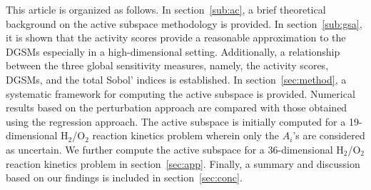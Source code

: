 This article is organized as follows. In section~\ref{sub:ac}, a brief
theoretical background on the active subspace methodology is provided. In
section~\ref{sub:gsa}, it is shown that the activity scores provide a
reasonable approximation to the DGSMs especially in a high-dimensional setting.
Additionally, a relationship between the three global sensitivity measures,
namely, the activity scores, DGSMs, and the total Sobol' indices is
established. In section~\ref{sec:method}, a systematic framework for computing
the active subspace is provided. 
Numerical results based on the perturbation approach are compared with those
obtained using the regression approach.  The active 
subspace is initially computed for a 19-dimensional 
H$_2$/O$_2$ reaction kinetics problem wherein only the $A_i$'s are
considered as uncertain. We further compute the active subspace
for a 36-dimensional H$_2$/O$_2$ reaction kinetics problem in section~\ref{sec:app}.
Finally, a summary and discussion based on our findings is included in
section~\ref{sec:conc}.










 




